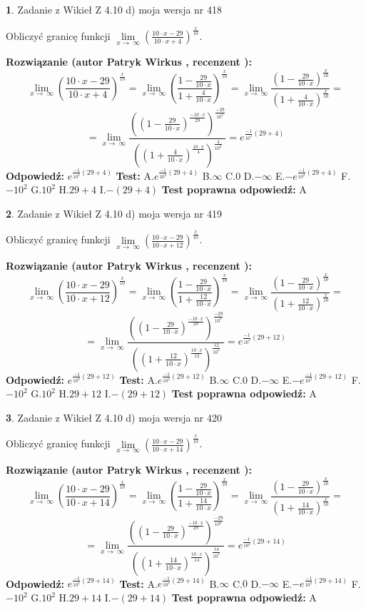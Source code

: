 \documentclass[12pt, a4paper]{article}
\theoremstyle{definition} %
\newtheorem{zad}{}
\newcommand{\zadStart}[1]{\begin{zad}#1\newline}
\newcommand{\zadStop}{\end{zad}}
\newcommand{\rozwStart}[2]{\noindent \textbf{Rozwiązanie (autor #1 , recenzent #2): }\newline}
\newcommand{\rozwStop}{\newline}
\newcommand{\odpStart}{\noindent \textbf{Odpowiedź:}\newline}
\newcommand{\odpStop}{\newline}
\newcommand{\testStart}{\noindent \textbf{Test:}\newline}
\newcommand{\testStop}{\newline}
\newcommand{\kluczStart}{\noindent \textbf{Test poprawna odpowiedź:}\newline}
\newcommand{\kluczStop}{\newline}
\begin{document}
\zadStart{Zadanie z Wikieł Z 4.10 d) moja wersja nr 418}


Obliczyć granicę funkcji  $\lim\limits_{x\to\ \infty}(\frac{10\cdot x-29}{10\cdot x+4})^{\frac{x}{10}}$.
\zadStop
\rozwStart{Patryk Wirkus}{}
$$\lim\limits_{x\to\ \infty}(\frac{10\cdot x-29}{10\cdot x+4})^{\frac{x}{10}} = \lim\limits_{x\to\ \infty}(\frac{1-\frac{29}{10\cdot x}}{1+\frac{4}{10\cdot x}})^{\frac{x}{10}}=\lim\limits_{x\to\ \infty}\frac{(1-\frac{29}{10\cdot x})^{\frac{x}{10}}}{(1+\frac{4}{10\cdot x})^{\frac{x}{10}}}=$$
$$=\lim\limits_{x\to\ \infty}\frac{((1-\frac{29}{10\cdot x})^{\frac{-10\cdot x}{29}})^{\frac{-29}{10^{2}}}}{((1+\frac{4}{10\cdot x})^{\frac{10\cdot x}{4}})^{\frac{4}{10^{2}}}}=e^{\frac{-1}{10^{2}}(29+4)}$$
\rozwStop
\odpStart
$e^{\frac{-1}{10^{2}}(29+4)}$
\odpStop
\testStart
A.$e^{\frac{-1}{10^{2}}(29+4)}$ B.$\infty$ C.$0$ D.$-\infty$ E.$-e^{\frac{-1}{10^{2}}(29+4)}$
F.$-10^{2}$ G.$10^{2}$
H.$29+4$
I.$-(29+4)$
\testStop
\kluczStart
A
\kluczStop



\zadStart{Zadanie z Wikieł Z 4.10 d) moja wersja nr 419}


Obliczyć granicę funkcji  $\lim\limits_{x\to\ \infty}(\frac{10\cdot x-29}{10\cdot x+12})^{\frac{x}{10}}$.
\zadStop
\rozwStart{Patryk Wirkus}{}
$$\lim\limits_{x\to\ \infty}(\frac{10\cdot x-29}{10\cdot x+12})^{\frac{x}{10}} = \lim\limits_{x\to\ \infty}(\frac{1-\frac{29}{10\cdot x}}{1+\frac{12}{10\cdot x}})^{\frac{x}{10}}=\lim\limits_{x\to\ \infty}\frac{(1-\frac{29}{10\cdot x})^{\frac{x}{10}}}{(1+\frac{12}{10\cdot x})^{\frac{x}{10}}}=$$
$$=\lim\limits_{x\to\ \infty}\frac{((1-\frac{29}{10\cdot x})^{\frac{-10\cdot x}{29}})^{\frac{-29}{10^{2}}}}{((1+\frac{12}{10\cdot x})^{\frac{10\cdot x}{12}})^{\frac{12}{10^{2}}}}=e^{\frac{-1}{10^{2}}(29+12)}$$
\rozwStop
\odpStart
$e^{\frac{-1}{10^{2}}(29+12)}$
\odpStop
\testStart
A.$e^{\frac{-1}{10^{2}}(29+12)}$ B.$\infty$ C.$0$ D.$-\infty$ E.$-e^{\frac{-1}{10^{2}}(29+12)}$
F.$-10^{2}$ G.$10^{2}$
H.$29+12$
I.$-(29+12)$
\testStop
\kluczStart
A
\kluczStop



\zadStart{Zadanie z Wikieł Z 4.10 d) moja wersja nr 420}


Obliczyć granicę funkcji  $\lim\limits_{x\to\ \infty}(\frac{10\cdot x-29}{10\cdot x+14})^{\frac{x}{10}}$.
\zadStop
\rozwStart{Patryk Wirkus}{}
$$\lim\limits_{x\to\ \infty}(\frac{10\cdot x-29}{10\cdot x+14})^{\frac{x}{10}} = \lim\limits_{x\to\ \infty}(\frac{1-\frac{29}{10\cdot x}}{1+\frac{14}{10\cdot x}})^{\frac{x}{10}}=\lim\limits_{x\to\ \infty}\frac{(1-\frac{29}{10\cdot x})^{\frac{x}{10}}}{(1+\frac{14}{10\cdot x})^{\frac{x}{10}}}=$$
$$=\lim\limits_{x\to\ \infty}\frac{((1-\frac{29}{10\cdot x})^{\frac{-10\cdot x}{29}})^{\frac{-29}{10^{2}}}}{((1+\frac{14}{10\cdot x})^{\frac{10\cdot x}{14}})^{\frac{14}{10^{2}}}}=e^{\frac{-1}{10^{2}}(29+14)}$$
\rozwStop
\odpStart
$e^{\frac{-1}{10^{2}}(29+14)}$
\odpStop
\testStart
A.$e^{\frac{-1}{10^{2}}(29+14)}$ B.$\infty$ C.$0$ D.$-\infty$ E.$-e^{\frac{-1}{10^{2}}(29+14)}$
F.$-10^{2}$ G.$10^{2}$
H.$29+14$
I.$-(29+14)$
\testStop
\kluczStart
A
\kluczStop
\end{document}
